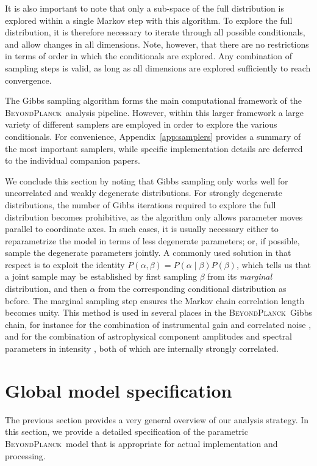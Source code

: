 \documentclass[onecolumn]{aa}
\newcommand{\BP}{\textsc{BeyondPlanck}}
\begin{document}
It is also important to note that only a sub-space of the full
distribution is explored within a single Markov step with this
algorithm. To explore the full distribution, it is therefore necessary
to iterate through all possible conditionals, and allow changes in all
dimensions. Note, however, that there are no restrictions in terms of
order in which the conditionals are explored. Any combination of
sampling steps is valid, as long as all dimensions are explored
sufficiently to reach convergence.

The Gibbs sampling algorithm forms the main computational framework of
the \BP\ analysis pipeline. However, within this larger framework a
large variety of different samplers are employed in order to explore
the various conditionals. For convenience, Appendix~\ref{app:samplers}
provides a summary of the most important samplers, while specific
implementation details are deferred to the individual companion
papers.

We conclude this section by noting that Gibbs sampling only works well
for uncorrelated and weakly degenerate distributions. For strongly
degenerate distributions, the number of Gibbs iterations required to
explore the full distribution becomes prohibitive, as the algorithm
only allows parameter moves parallel to coordinate axes. In such
cases, it is usually necessary either to reparametrize the model in
terms of less degenerate parameters; or, if possible, sample the
degenerate parameters jointly. A commonly used solution in that respect
is to exploit the identity $P(\alpha,\beta) = P(\alpha\mid
\beta)P(\beta)$, which tells us that a joint sample may be established
by first sampling $\beta$ from its \emph{marginal} distribution, and
then $\alpha$ from the corresponding conditional distribution as
before. The marginal sampling step ensures the Markov chain
correlation length becomes unity. This method is used in several places
in the \BP\ Gibbs chain, for instance for the combination of
instrumental gain and correlated noise \citep{bp07}, and for the
combination of astrophysical component amplitudes and spectral
parameters in intensity \citep{bp13}, both of which are internally
strongly correlated.


\section{Global model specification}
\label{sec:model}

The previous section provides a very general overview of our analysis
strategy. In this section, we provide a detailed specification of the
parametric \BP\ model that is appropriate for actual implementation
and processing.
\end{document}
